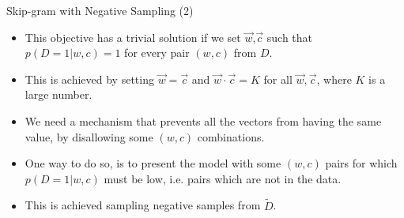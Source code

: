 \begin{frame}{Skip-gram with Negative Sampling (2)}
\begin{scriptsize}
\begin{itemize}


\item This objective has a trivial solution if we set $\vec{w}$,$\vec{c}$ such that $p(D=1|w,c)=1$ for every pair $(w,c)$ from $D$.
\item This is achieved by setting $\vec{w}=\vec{c}$  and $\vec{w} \cdot \vec{c} = K$ for all $\vec{w},\vec{c}$, where $K$ is a large number.
\item We need a mechanism that prevents all the vectors from having the same value, by disallowing some $(w, c)$ combinations. 
\item One way to do so, is to present the model with some $(w, c)$ pairs for which $p(D= 1|w, c)$ must be low, i.e.
pairs which are not in the data.  
\item This is achieved sampling negative samples from $\tilde{D}$. 





\end{itemize}
\end{scriptsize}
\end{frame}


